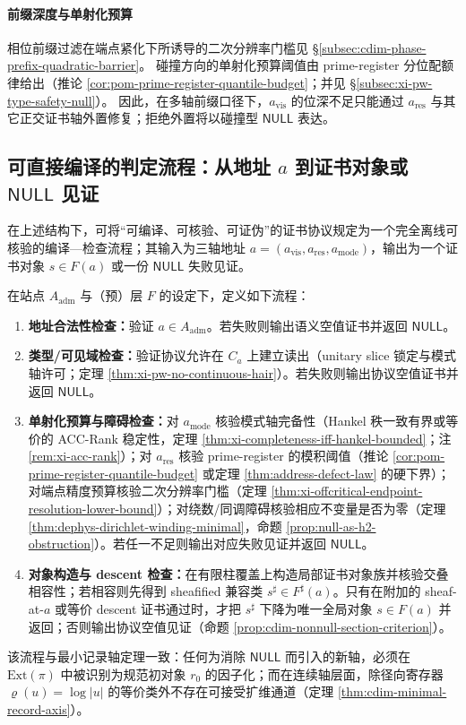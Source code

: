 \paragraph{前缀深度与单射化预算}
相位前缀过滤在端点紧化下所诱导的二次分辨率门槛见 \S\ref{subsec:cdim-phase-prefix-quadratic-barrier}。
碰撞方向的单射化预算阈值由 prime-register 分位配额律给出（推论 \ref{cor:pom-prime-register-quantile-budget}；并见 \S\ref{subsec:xi-pw-type-safety-null}）。
因此，在多轴前缀口径下，\(a_{\mathrm{vis}}\) 的位深不足只能通过 \(a_{\mathrm{res}}\) 与其它正交证书轴外置修复；拒绝外置将以碰撞型 \(\mathsf{NULL}\) 表达。

\subsection{可直接编译的判定流程：从地址 \texorpdfstring{$a$}{a} 到证书对象或 \texorpdfstring{$\mathsf{NULL}$}{NULL} 见证}\label{subsec:cdim-address-compiler}
在上述结构下，可将“可编译、可核验、可证伪”的证书协议规定为一个完全离线可核验的编译—检查流程；其输入为三轴地址 \(a=(a_{\mathrm{vis}},a_{\mathrm{res}},a_{\mathrm{mode}})\)，输出为一个证书对象 \(s\in F(a)\) 或一份 \(\mathsf{NULL}\) 失败见证。

\begin{algorithm}\label{alg:cdim-three-axis-address-compile}
在站点 \(A_{\mathrm{adm}}\) 与（预）层 \(F\) 的设定下，定义如下流程：
\begin{enumerate}
  \item \textbf{地址合法性检查：}验证 \(a\in A_{\mathrm{adm}}\)。若失败则输出语义空值证书并返回 \(\mathsf{NULL}\)。
  \item \textbf{类型/可见域检查：}验证协议允许在 \(C_a\) 上建立读出（unitary slice 锁定与模式轴许可；定理 \ref{thm:xi-pw-no-continuous-hair}）。若失败则输出协议空值证书并返回 \(\mathsf{NULL}\)。
  \item \textbf{单射化预算与障碍检查：}对 \(a_{\mathrm{mode}}\) 核验模式轴完备性（Hankel 秩一致有界或等价的 ACC-Rank 稳定性，定理 \ref{thm:xi-completeness-iff-hankel-bounded}；注 \ref{rem:xi-acc-rank}）；对 \(a_{\mathrm{res}}\) 核验 prime-register 的模积阈值（推论 \ref{cor:pom-prime-register-quantile-budget} 或定理 \ref{thm:address-defect-law} 的硬下界）；对端点精度预算核验二次分辨率门槛（定理 \ref{thm:xi-offcritical-endpoint-resolution-lower-bound}）；对绕数/同调障碍核验相应不变量是否为零（定理 \ref{thm:dephys-dirichlet-winding-minimal}，命题 \ref{prop:null-as-h2-obstruction}）。若任一不足则输出对应失败见证并返回 \(\mathsf{NULL}\)。
  \item \textbf{对象构造与 descent 检查：}在有限柱覆盖上构造局部证书对象族并核验交叠相容性；若相容则先得到 sheafified 兼容类 \(s^\sharp\in F^\sharp(a)\)。只有在附加的 sheaf-at-\(a\) 或等价 descent 证书通过时，才把 \(s^\sharp\) 下降为唯一全局对象 \(s\in F(a)\) 并返回；否则输出协议空值见证（命题 \ref{prop:cdim-nonnull-section-criterion}）。
\end{enumerate}
\end{algorithm}
该流程与最小记录轴定理一致：任何为消除 \(\mathsf{NULL}\) 而引入的新轴，必须在 \(\mathrm{Ext}(\pi)\) 中被识别为规范初对象 \(r_0\) 的因子化；而在连续轴层面，除径向寄存器 \(\varrho(u)=\log|u|\) 的等价类外不存在可接受扩维通道（定理 \ref{thm:cdim-minimal-record-axis}）。

